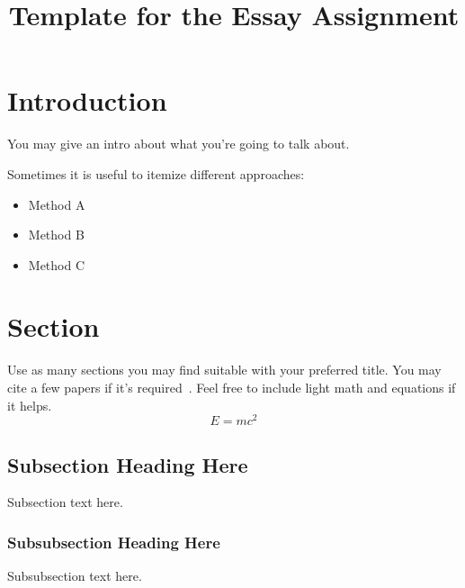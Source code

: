 \documentclass[conference]{IEEEtran}
\begin{document}
\title{Template for the Essay Assignment}

\author{
}



\maketitle

\IEEEpeerreviewmaketitle

\section{Introduction}
You may give an intro about what you're going to talk about.

Sometimes it is useful to itemize different approaches:
\begin{itemize}
 \item Method A
 \item Method B
 \item Method C
\end{itemize}


\section{Section}

Use as many sections you may find suitable with your preferred title. You may cite a few papers if it's required~\cite{kalman1960new,McGeer01041990}. Feel free to include light math and equations if it helps.
\begin{equation}
 E = mc^2
\end{equation}


\subsection{Subsection Heading Here}
Subsection text here.

\subsubsection{Subsubsection Heading Here}
Subsubsection text here.
\end{document}
